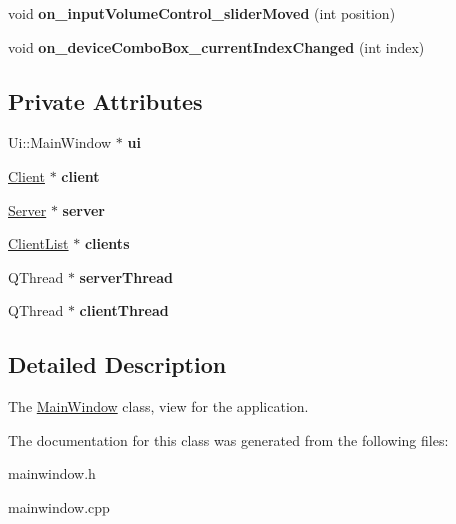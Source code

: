 \begin{DoxyCompactItemize}
\item 
\hypertarget{class_main_window_a396f4f5f9647db90598dae948d56ef70}{void {\bfseries on\+\_\+input\+Volume\+Control\+\_\+slider\+Moved} (int position)}\label{class_main_window_a396f4f5f9647db90598dae948d56ef70}

\item 
\hypertarget{class_main_window_a9f27c5371f7dab39063a41706c5efa09}{void {\bfseries on\+\_\+device\+Combo\+Box\+\_\+current\+Index\+Changed} (int index)}\label{class_main_window_a9f27c5371f7dab39063a41706c5efa09}

\end{DoxyCompactItemize}
\subsection*{Private Attributes}
\begin{DoxyCompactItemize}
\item 
\hypertarget{class_main_window_a35466a70ed47252a0191168126a352a5}{Ui\+::\+Main\+Window $\ast$ {\bfseries ui}}\label{class_main_window_a35466a70ed47252a0191168126a352a5}

\item 
\hypertarget{class_main_window_a5ff30e3e49a45f2b768cff8287c8cee3}{\hyperlink{class_client}{Client} $\ast$ {\bfseries client}}\label{class_main_window_a5ff30e3e49a45f2b768cff8287c8cee3}

\item 
\hypertarget{class_main_window_aca501db88230221cadf592104aa37ee5}{\hyperlink{class_server}{Server} $\ast$ {\bfseries server}}\label{class_main_window_aca501db88230221cadf592104aa37ee5}

\item 
\hypertarget{class_main_window_a9037ac1b7578485d6733a5d9a93ea04e}{\hyperlink{class_client_list}{Client\+List} $\ast$ {\bfseries clients}}\label{class_main_window_a9037ac1b7578485d6733a5d9a93ea04e}

\item 
\hypertarget{class_main_window_a7b2bc2ba82b635e3fe38c16228089a69}{Q\+Thread $\ast$ {\bfseries server\+Thread}}\label{class_main_window_a7b2bc2ba82b635e3fe38c16228089a69}

\item 
\hypertarget{class_main_window_a91a3d3c80f2654854f8879fcfbc55f97}{Q\+Thread $\ast$ {\bfseries client\+Thread}}\label{class_main_window_a91a3d3c80f2654854f8879fcfbc55f97}

\end{DoxyCompactItemize}


\subsection{Detailed Description}
The \hyperlink{class_main_window}{Main\+Window} class, view for the application. 

The documentation for this class was generated from the following files\+:\begin{DoxyCompactItemize}
\item 
mainwindow.\+h\item 
mainwindow.\+cpp\end{DoxyCompactItemize}
